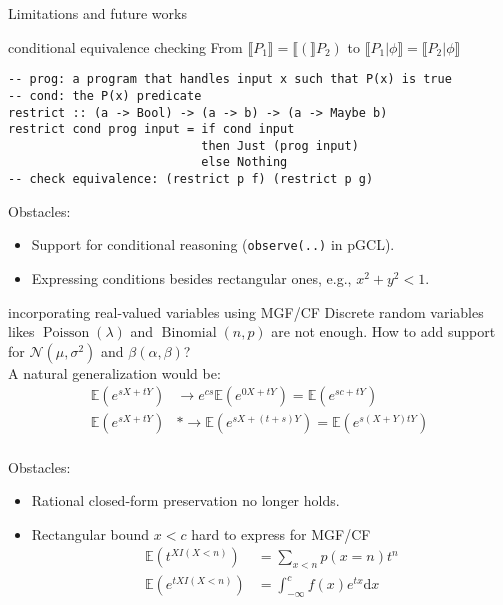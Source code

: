 \documentclass[8pt]{beamer}
\renewcommand{\S}[1]{ \llbracket #1 \rrbracket }
\newcommand{\E}{ \mathbb{E} }
\begin{document}
\begin{frame}{Limitations and future works}
	\begin{block}{conditional equivalence checking}
		From \(\S{P_1} = \S(P_2)\) to \(\S{P_1|\phi} = \S{P_2|\phi}\)
		\begin{verbatim}
-- prog: a program that handles input x such that P(x) is true
-- cond: the P(x) predicate
restrict :: (a -> Bool) -> (a -> b) -> (a -> Maybe b)
restrict cond prog input = if cond input
                           then Just (prog input)
                           else Nothing
-- check equivalence: (restrict p f) (restrict p g)
			\end{verbatim}

		Obstacles:
		\begin{itemize}
			\item Support for conditional reasoning (\texttt{observe(..)} in pGCL).
			\item Expressing conditions besides rectangular ones, e.g., \(x^2 + y^2 < 1\).
		\end{itemize}
	\end{block}

	\begin{block}{incorporating real-valued variables using MGF/CF}
		Discrete random variables likes \(\operatorname{Poisson}(\lambda)\) and \(\operatorname{Binomial}(n,p)\) are not enough.
		How to add support for \(\mathcal{N}(\mu,\sigma^2)\) and \(\beta(\alpha,\beta)\)?\\

		A natural generalization would be:
		\begin{align*}
			\E(e^{sX + tY}) & \to e^{cs} \E(e^{0X + tY}) = \E(e^{sc + tY}) \\
			\E(e^{sX + tY}) & *\to \E(e^{sX + (t+s)Y}) = \E(e^{s(X+Y) tY}) \\
		\end{align*}

		Obstacles:
		\begin{itemize}
			\item Rational closed-form preservation no longer holds.
			\item Rectangular bound $x<c$ hard to express for MGF/CF
			      \begin{align*}
				      \E(t^{X I(X<n)})  & = \sum_{x<n} p(x=n) t^n                      \\
				      \E(e^{tX I(X<n)}) & = \int_{-\infty}^{c} f(x) e^{tx} \mathrm{d}x \\
			      \end{align*}
		\end{itemize}
	\end{block}


\end{frame}
\end{document}
